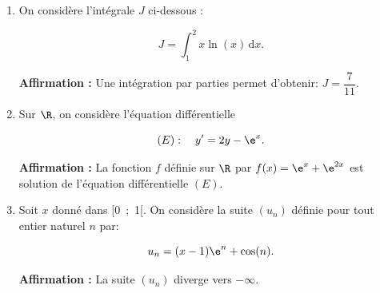 \begin{enumerate}[start=3]
\item On considère l'intégrale $J$ ci-dessous : 

\[J = \displaystyle\int_1^2 x \ln (x)\,\text{d}x.\]

\textbf{Affirmation  :} Une intégration par parties permet d'obtenir: $J = \dfrac{7}{11}$.

\item Sur $\R$, on considère l'équation différentielle 

\[(E) :\quad  y' = 2y - \e^x.\]

\textbf{Affirmation  :} La fonction $f$ définie sur $\R$ par $f(x) = \e^x + \e^{2x}$ est solution de l'équation différentielle $(E)$.
\item  Soit $x$ donné dans [0~;~1[. On considère la suite $(u_n)$ définie pour tout entier naturel $n$ par:

\[u_n = (x - 1)\e^n + \cos (n).\]

\textbf{Affirmation  :} La suite $(u_n)$ diverge vers $-\infty.$
\end{enumerate}
